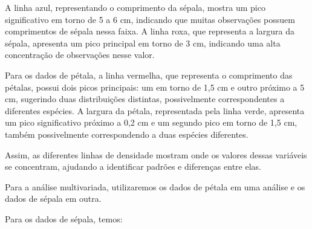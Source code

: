 \documentclass[
  a4paperpaper,
]{article}
\newenvironment{Shaded}{\begin{snugshade}}{\end{snugshade}}
\newcommand{\AttributeTok}[1]{\textcolor[rgb]{0.40,0.45,0.13}{#1}}
\newcommand{\CommentTok}[1]{\textcolor[rgb]{0.37,0.37,0.37}{#1}}
\newcommand{\ConstantTok}[1]{\textcolor[rgb]{0.56,0.35,0.01}{#1}}
\newcommand{\DecValTok}[1]{\textcolor[rgb]{0.68,0.00,0.00}{#1}}
\newcommand{\FunctionTok}[1]{\textcolor[rgb]{0.28,0.35,0.67}{#1}}
\newcommand{\NormalTok}[1]{\textcolor[rgb]{0.00,0.23,0.31}{#1}}
\newcommand{\OtherTok}[1]{\textcolor[rgb]{0.00,0.23,0.31}{#1}}
\newcommand{\SpecialCharTok}[1]{\textcolor[rgb]{0.37,0.37,0.37}{#1}}
\newcommand{\StringTok}[1]{\textcolor[rgb]{0.13,0.47,0.30}{#1}}
\begin{document}
A linha azul, representando o comprimento da sépala, mostra um pico
significativo em torno de 5 a 6 cm, indicando que muitas observações
possuem comprimentos de sépala nessa faixa. A linha roxa, que representa
a largura da sépala, apresenta um pico principal em torno de 3 cm,
indicando uma alta concentração de observações nesse valor.

Para os dados de pétala, a linha vermelha, que representa o comprimento
das pétalas, possui dois picos principais: um em torno de 1,5 cm e outro
próximo a 5 cm, sugerindo duas distribuições distintas, possivelmente
correspondentes a diferentes espécies. A largura da pétala, representada
pela linha verde, apresenta um pico significativo próximo a 0,2 cm e um
segundo pico em torno de 1,5 cm, também possivelmente correspondendo a
duas espécies diferentes.

Assim, as diferentes linhas de densidade mostram onde os valores dessas
variáveis se concentram, ajudando a identificar padrões e diferenças
entre elas.

Para a análise multivariada, utilizaremos os dados de pétala em uma
análise e os dados de sépala em outra.

Para os dados de sépala, temos:

~

\begin{Shaded}
\end{Shaded}
\end{document}
